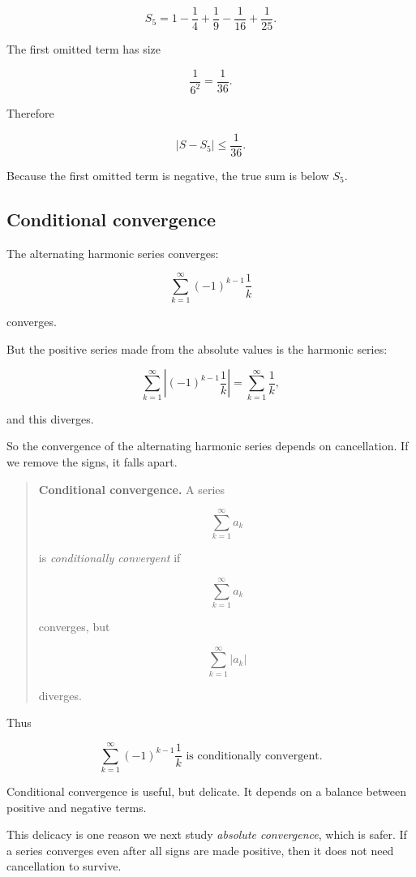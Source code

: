 \[
S_5
=
1-\frac14+\frac19-\frac1{16}+\frac1{25}.
\]

The first omitted term has size

\[
\frac1{6^2}=\frac1{36}.
\]

Therefore

\[
\boxed{
|S-S_5|\le \frac1{36}.
}
\]

Because the first omitted term is negative, the true sum is below \(S_5\).

\subsection{Conditional convergence}
\label{subsec:conditional-convergence}

The alternating harmonic series converges:

\[
\sum_{k=1}^{\infty}(-1)^{k-1}\frac1k
\]

converges.

But the positive series made from the absolute values is the harmonic series:

\[
\sum_{k=1}^{\infty}\left|(-1)^{k-1}\frac1k\right|
=
\sum_{k=1}^{\infty}\frac1k,
\]

and this diverges.

So the convergence of the alternating harmonic series depends on cancellation.  If we
remove the signs, it falls apart.

\begin{quote}
\textbf{Conditional convergence.}
A series

\[
\sum_{k=1}^{\infty}a_k
\]

is \emph{conditionally convergent} if

\[
\sum_{k=1}^{\infty}a_k
\]

converges, but

\[
\sum_{k=1}^{\infty}|a_k|
\]

diverges.
\end{quote}

Thus

\[
\boxed{
\sum_{k=1}^{\infty}(-1)^{k-1}\frac1k
\text{ is conditionally convergent.}
}
\]

Conditional convergence is useful, but delicate.  It depends on a balance between
positive and negative terms.

This delicacy is one reason we next study \emph{absolute convergence}, which is safer.
If a series converges even after all signs are made positive, then it does not need
cancellation to survive.

